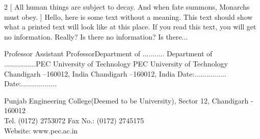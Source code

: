 \documentclass[a4paper]{article}
\begin{document}
\begin{large}
\begin{multicols}{2}
[
All human things are subject to decay. And when fate summons, Monarchs must obey.
]
Hello, here is some text without a meaning.  This text should show what 
a printed text will look like at this place.
If you read this text, you will get no information.  Really?  Is there 
no information?  Is there...
\end{multicols}



Professor                                                         Assistant ProfessorDepartment of ...........                   Department of ................PEC University of Technology                                        PEC University of Technology                                                        Chandigarh –160012, India                                            Chandigarh –160012, India                                                                                                   Date:................                                                           Date:..................

\begin{center}
{\color{gray}
Punjab Engineering College(Deemed to be University), Sector 12, Chandigarh - 160012\\
Tel. (0172) 2753072 Fax No.: (0172) 2745175\\
Website: www.pec.ac.in}
\end{center}


\end{large}
\end{document}
